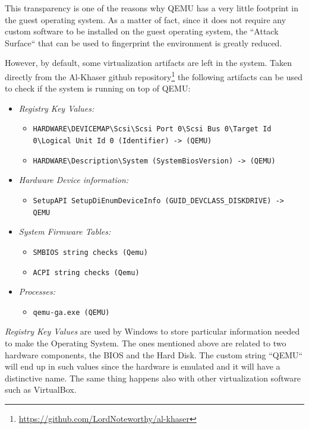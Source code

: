 This transparency is one of the reasons why QEMU has a very little footprint in the guest operating system. As a matter of fact, since it does not require any custom software to be installed on the guest operating system, the ``Attack Surface`` that can be used to fingerprint the environment is greatly reduced. 

However, by default, some virtualization artifacts are left in the system. Taken directly from the Al-Khaser github repository\footnote{\url{https://github.com/LordNoteworthy/al-khaser}} the following artifacts can be used to check if the system is running on top of QEMU:

\begin{itemize}
    \item \textit{Registry Key Values:}
    \begin{itemize}
        \item \lstinline{HARDWARE\DEVICEMAP\Scsi\Scsi Port 0\Scsi Bus 0\Target Id 0\Logical Unit Id 0 (Identifier) -> (QEMU)}
    \item \lstinline{HARDWARE\Description\System (SystemBiosVersion) -> (QEMU)} 
    \end{itemize}
    
    \item \textit{Hardware Device information:}
    \begin{itemize}
        \item \lstinline{SetupAPI SetupDiEnumDeviceInfo (GUID_DEVCLASS_DISKDRIVE) -> QEMU} 
    \end{itemize}
    
    \item \textit{System Firmware Tables:}
    \begin{itemize}
        \item \lstinline{SMBIOS string checks (Qemu)}
        \item \lstinline{ACPI string checks (Qemu)}
    \end{itemize}
    
    \item \textit{Processes:}
    \begin{itemize}
        \item \lstinline{qemu-ga.exe (QEMU)}
    \end{itemize}
\end{itemize}

\textit{Registry Key Values} are used by Windows to store particular information needed to make the Operating System. The ones mentioned above are related to two hardware components, the BIOS and the Hard Disk. The custom string ``QEMU`` will end up in such values since the hardware is emulated and it will have a distinctive name. The same thing happens also with other virtualization software such as VirtualBox.

